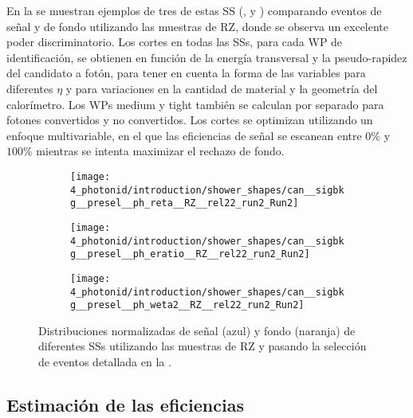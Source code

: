 En la \Fig{\ref{fig:pid_ss:optimisation:shower_shapes}} se muestran ejemplos de tres de estas \ac{SS} (\reta, \eratio y \weta) comparando eventos de señal y de fondo utilizando las muestras de \ac{RZ}, donde se observa un excelente poder discriminatorio.
Los cortes en todas las \acp{SS}, para cada \ac{WP} de identificación, se obtienen en función de la energía transversal y la pseudo-rapidez del candidato a fotón, para tener en cuenta la forma de las variables para diferentes \(\eta\) y para variaciones en la cantidad de material y la geometría del calorímetro. Los \acp{WP} medium y tight también se calculan por separado para fotones convertidos y no convertidos.
Los cortes se optimizan utilizando un enfoque multivariable, en el que las eficiencias de señal se escanean entre \(0\%\) y \(100\%\) mientras se intenta maximizar el rechazo de fondo.

\begin{figure}[ht!]
    \centering
    \begin{subfigure}[h]{0.32\linewidth}
        \centering
        \texttt{[image: 4\_photonid/introduction/shower\_shapes/can\_\_sigbkg\_\_presel\_\_ph\_reta\_\_RZ\_\_rel22\_run2\_Run2]}
        \caption{\reta}
        \label{fig:pid_ss:optimisation:shower_shapes:reta}
    \end{subfigure}
    \hfill
    \begin{subfigure}[h]{0.32\linewidth}
        \centering
        \texttt{[image: 4\_photonid/introduction/shower\_shapes/can\_\_sigbkg\_\_presel\_\_ph\_eratio\_\_RZ\_\_rel22\_run2\_Run2]}
        \caption{\eratio}
        \label{fig:pid_ss:optimisation:shower_shapes:eratio}
    \end{subfigure}
    \hfill
    \begin{subfigure}[h]{0.32\linewidth}
        \centering
        \texttt{[image: 4\_photonid/introduction/shower\_shapes/can\_\_sigbkg\_\_presel\_\_ph\_weta2\_\_RZ\_\_rel22\_run2\_Run2]}
        \caption{\weta}
        \label{fig:pid_ss:optimisation:shower_shapes:weta2}
    \end{subfigure}
    \caption{Distribuciones normalizadas de se\~nal (azul) y fondo (naranja) de diferentes \acp{SS} utilizando las muestras de \ac{RZ} y pasando la selecci\'on de eventos detallada en la \Sect{\ref{subsec:pid_ss:pid:event_selection}}.}
    \label{fig:pid_ss:optimisation:shower_shapes}
\end{figure}



\subsection{Estimaci\'on de las eficiencias}

